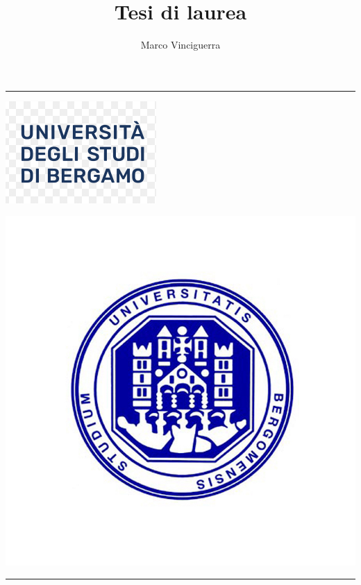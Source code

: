\documentclass{article}
\author{Marco Vinciguerra}
\title{Tesi di laurea}
\date{}
\begin{document}
\begin{flushright}
    \noindent \rule{21.cm}{0.4pt}
    \includegraphics[scale=0.4]{logo.PNG}

    \includegraphics[scale=0.1]{UniBg-logo.jpg}
    \noindent \rule{21.cm}{0.4pt}

\end{flushright}

\maketitle
\end{document}
